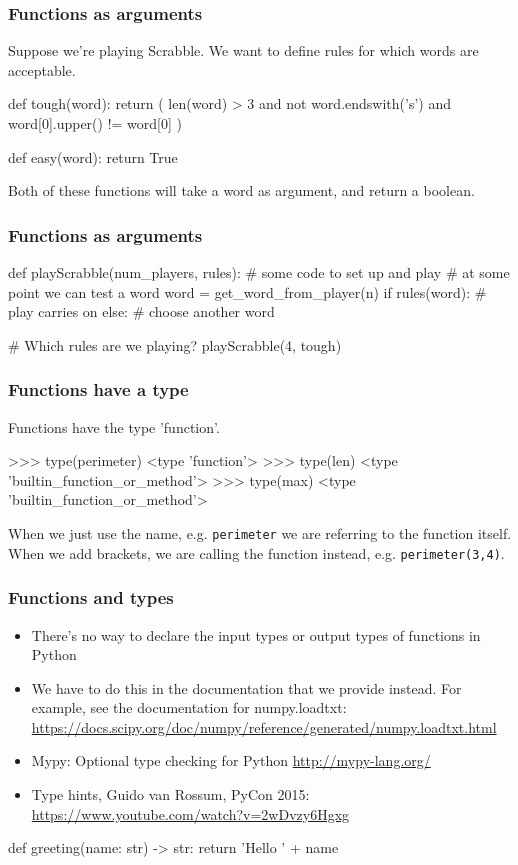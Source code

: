 \documentclass{beamer}
\begin{document}
\begin{frame}[fragile]
\frametitle{Functions as arguments}
Suppose we're playing Scrabble. We want to define rules for which
words are acceptable. 
\begin{code}
def tough(word):
   return ( len(word) > 3
            and not word.endswith('s')
            and word[0].upper() != word[0] )

def easy(word):
   return True
\end{code}
Both of these functions will take a word as argument, and return a boolean.
\end{frame}


\begin{frame}[fragile]
\frametitle{Functions as arguments}
\begin{code}
def playScrabble(num_players, rules):
   # some code to set up and play
   # at some point we can test a word
   word = get_word_from_player(n)
   if rules(word):
      # play carries on
   else:
      # choose another word

# Which rules are we playing?
playScrabble(4, tough)
\end{code}
\end{frame}

\begin{frame}[fragile]
\frametitle{Functions have a type}
Functions have the type 'function'.
\begin{code}
>>> type(perimeter)
<type 'function'>
>>> type(len)
<type 'builtin_function_or_method'>
>>> type(max)
<type 'builtin_function_or_method'>
\end{code}
When we just use the name, e.g. \texttt{perimeter} we are referring
to the function itself. When we add brackets, we are calling the
function instead, e.g.  \texttt{perimeter(3,4)}.
\end{frame}


\begin{frame}[fragile]
\frametitle{Functions and types}
\begin{itemize}
\item There's no way to declare the input types or output types of
  functions in Python 
\item We have to do this in the documentation that we provide
  instead. For example, see the documentation for numpy.loadtxt:
  \url{https://docs.scipy.org/doc/numpy/reference/generated/numpy.loadtxt.html}
\item Mypy: Optional type checking for Python \url{http://mypy-lang.org/}
\item Type hints, Guido van Rossum, PyCon 2015: \url{https://www.youtube.com/watch?v=2wDvzy6Hgxg}
\end{itemize}
\begin{code}
def greeting(name: str) -> str:
    return 'Hello ' + name
\end{code}
\end{frame}
\end{document}

